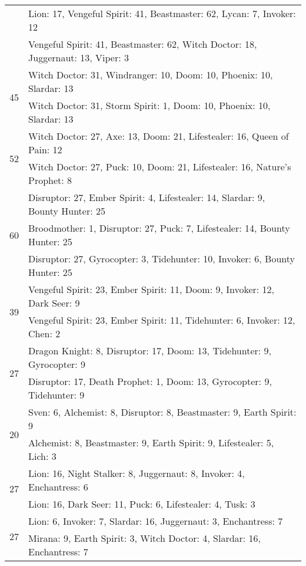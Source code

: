 \begin{table}[H]
\begin{tabular}{ | c | p{12.5cm} | }
& Lion: 17, Vengeful Spirit: 41, Beastmaster: 62, Lycan: 7, Invoker: 12 \\
& Vengeful Spirit: 41, Beastmaster: 62, Witch Doctor: 18, Juggernaut: 13, Viper: 3 \\
\hline
\multirow{2}{*}{45}
& Witch Doctor: 31, Windranger: 10, Doom: 10, Phoenix: 10, Slardar: 13 \\
& Witch Doctor: 31, Storm Spirit: 1, Doom: 10, Phoenix: 10, Slardar: 13 \\
\hline
\multirow{2}{*}{52}
& Witch Doctor: 27, Axe: 13, Doom: 21, Lifestealer: 16, Queen of Pain: 12 \\
& Witch Doctor: 27, Puck: 10, Doom: 21, Lifestealer: 16, Nature's Prophet: 8 \\
\hline
\multirow{3}{*}{60}
& Disruptor: 27, Ember Spirit: 4, Lifestealer: 14, Slardar: 9, Bounty Hunter: 25 \\
& Broodmother: 1, Disruptor: 27, Puck: 7, Lifestealer: 14, Bounty Hunter: 25 \\
& Disruptor: 27, Gyrocopter: 3, Tidehunter: 10, Invoker: 6, Bounty Hunter: 25 \\
\hline
\multirow{2}{*}{39}
& Vengeful Spirit: 23, Ember Spirit: 11, Doom: 9, Invoker: 12, Dark Seer: 9 \\
& Vengeful Spirit: 23, Ember Spirit: 11, Tidehunter: 6, Invoker: 12, Chen: 2 \\
\hline
\multirow{2}{*}{27}
& Dragon Knight: 8, Disruptor: 17, Doom: 13, Tidehunter: 9, Gyrocopter: 9 \\
& Disruptor: 17, Death Prophet: 1, Doom: 13, Gyrocopter: 9, Tidehunter: 9 \\
\hline
\multirow{2}{*}{20}
& Sven: 6, Alchemist: 8, Disruptor: 8, Beastmaster: 9, Earth Spirit: 9 \\
& Alchemist: 8, Beastmaster: 9, Earth Spirit: 9, Lifestealer: 5, Lich: 3 \\
\hline
\multirow{2}{*}{27}
& Lion: 16, Night Stalker: 8, Juggernaut: 8, Invoker: 4, Enchantress: 6 \\
& Lion: 16, Dark Seer: 11, Puck: 6, Lifestealer: 4, Tusk: 3 \\
\hline
\multirow{2}{*}{27}
& Lion: 6, Invoker: 7, Slardar: 16, Juggernaut: 3, Enchantress: 7 \\
& Mirana: 9, Earth Spirit: 3, Witch Doctor: 4, Slardar: 16, Enchantress: 7 \\
\hline
    \end{tabular}
    \caption{}
    \label{}
    \end{table}


